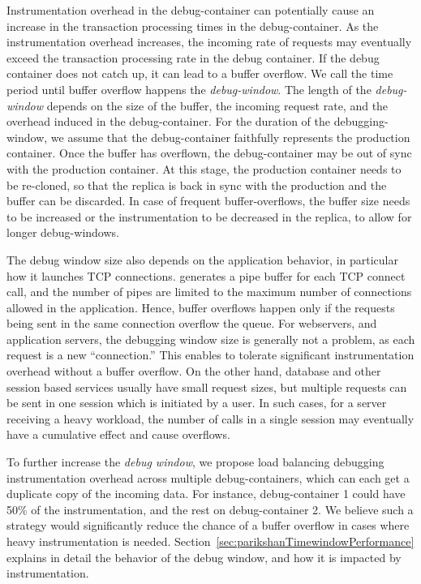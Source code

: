 Instrumentation overhead in the debug-container can potentially cause an increase in the transaction processing times in the debug-container.
As the instrumentation overhead increases, the incoming rate of requests may eventually exceed the transaction processing rate in the debug container.
If the debug container does not catch up, it can lead to a buffer overflow. 
We call the time period until buffer overflow happens the \emph{debug-window}.
The length of the \emph{debug-window} depends on the size of the buffer, the incoming request rate, and the overhead induced in the debug-container. 
For the duration of the debugging-window, we assume that the debug-container faithfully represents the production container. 
Once the buffer has overflown, the debug-container may be out of sync with the production container. 
At this stage, the production container needs to be re-cloned, so that the replica is back in sync with the production and the buffer can be discarded.
In case of frequent buffer-overflows, the buffer size needs to be increased or the instrumentation to be decreased in the replica, to allow for longer debug-windows.

The debug window size also depends on the application behavior, in particular how it launches TCP connections. 
\parikshan generates a pipe buffer for each TCP connect call, and the number of pipes are limited to the maximum number of connections allowed in the application.
Hence, buffer overflows happen only if the requests being sent in the same connection overflow the queue.
For webservers, and application servers, the debugging window size is generally not a problem, as each request is a new ``connection.''
This enables \parikshan to tolerate significant instrumentation overhead without a buffer overflow.
On the other hand, database and other session based services usually have small request sizes, but multiple requests can be sent in one session which is initiated by a user. 
In such cases, for a server receiving a heavy workload, the number of calls in a single session may eventually have a cumulative effect and cause overflows.

To further increase the \emph{debug window}, we propose load balancing debugging instrumentation overhead across multiple debug-containers, which can each get a duplicate copy of the incoming data. 
For instance, debug-container 1 could have 50\% of the instrumentation, and the rest on debug-container 2.
We believe such a strategy would significantly reduce the chance of a buffer overflow in cases where heavy instrumentation is needed.
Section~\ref{sec:parikshanTimewindowPerformance} explains in detail the behavior of the debug window, and how it is impacted by instrumentation.


